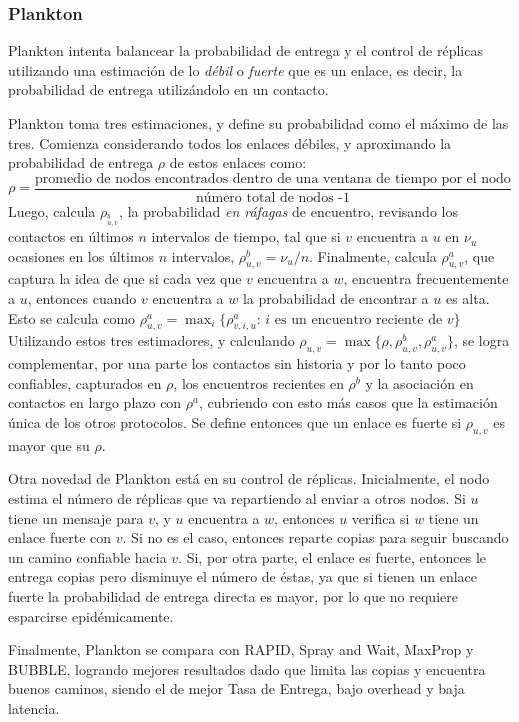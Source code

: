 \subsubsection{Plankton }
Plankton\cite{plankton} intenta balancear la probabilidad de entrega y el control de réplicas utilizando una estimación de lo \emph{débil} o \emph{fuerte} que es un enlace, es decir, la probabilidad de entrega utilizándolo en un contacto.

Plankton toma tres estimaciones, y define su probabilidad como el máximo de las tres. Comienza considerando todos los enlaces débiles, y aproximando la probabilidad de entrega $\rho$ de estos enlaces como:
$$\rho = \frac{\mbox{promedio de nodos encontrados dentro de una ventana de tiempo por el nodo}}{\mbox{número total de nodos -1}}$$
Luego, calcula $\rho_^b_{u,v}$, la probabilidad \emph{en ráfagas} de encuentro, revisando los contactos en últimos $n$ intervalos de tiempo, tal que si $v$ encuentra a $u$ en $\nu_u$ ocasiones en los últimos $n$ intervalos, $\rho^b_{u,v} = \nu_u /n $.
Finalmente, calcula $\rho^a_{u,v}$, que captura la idea de que si cada vez que $v$ encuentra a $w$, encuentra frecuentemente a $u$, entonces cuando $v$ encuentra a $w$ la probabilidad de encontrar a $u$ es alta. Esto se calcula como $\rho^a_{u,v} = \max_i\{\rho^a_{v,i,u} \mbox{: $i$ es un encuentro reciente de $v$}\}$
Utilizando estos tres estimadores, y calculando $\rho_{u,v} = \max\{\rho, \rho^b_{u,v}, \rho^a_{u,v}\}$, se logra complementar, por una parte los contactos sin historia y por lo tanto poco confiables, capturados en $\rho$, los encuentros recientes en $\rho^b$ y la asociación en contactos en largo plazo con $\rho^a$, cubriendo con esto más casos que la estimación única de los otros protocolos. Se define entonces que un enlace es fuerte si $\rho_{u,v}$ es mayor que su $\rho$.

Otra novedad de Plankton está en su control de réplicas. Inicialmente, el nodo estima el número de réplicas que va repartiendo al enviar a otros nodos. Si $u$ tiene un mensaje para $v$, y $u$ encuentra a $w$, entonces $u$ verifica si $w$ tiene un enlace fuerte con $v$. Si no es el caso, entonces reparte copias para seguir buscando un camino confiable hacia $v$. Si, por otra parte, el enlace es fuerte, entonces le entrega copias pero disminuye el número de éstas, ya que si tienen un enlace fuerte la probabilidad de entrega directa es mayor, por lo que no requiere esparcirse epidémicamente.

Finalmente, Plankton se compara con RAPID, Spray and Wait, MaxProp y BUBBLE, logrando mejores resultados dado que limita las copias y encuentra buenos caminos, siendo el de mejor Tasa de Entrega, bajo overhead y baja latencia. 